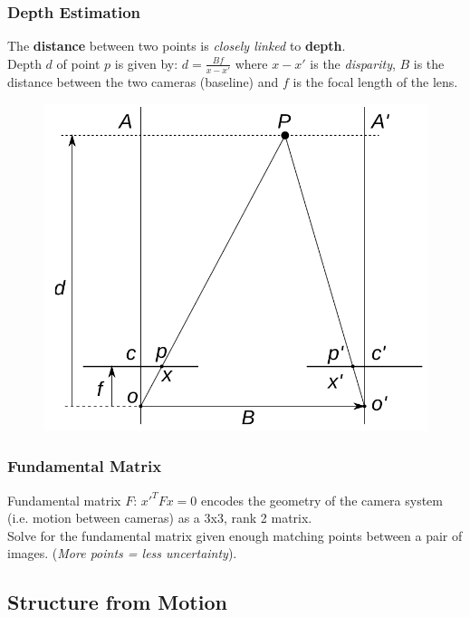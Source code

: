 \documentclass[english, 10pt]{article}
\begin{document}
\subsubsection{Depth Estimation}

The \textbf{distance} between two points is \textit{closely linked} to \textbf{depth}. \\

Depth $d$ of point $p$ is given by: $ d = \frac{Bf}{x-x'}$ where $x-x'$ is the \textit{disparity}, $B$ is the distance between the two cameras (baseline) and $f$ is the focal length of the lens.

\begin{figure}[ht!]     
	\centering 
	\includegraphics[scale=0.3]{depth.png}
\end{figure}

\subsubsection{Fundamental Matrix}

Fundamental matrix $F$: $x'^TFx = 0$ encodes the geometry of the camera system (i.e. motion between cameras) as a 3x3, rank 2 matrix. \\

Solve for the fundamental matrix given enough matching points between a pair of images. (\textit{More points = less uncertainty}).

\subsection{Structure from Motion}
\end{document}
